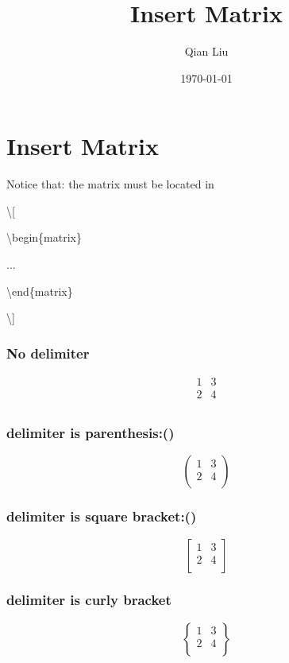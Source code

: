 \documentclass{article}
\author{Qian Liu}
\title{Insert Matrix}
\date{\today}
\begin{document}
\maketitle
\tableofcontents

\newpage
\section{Insert Matrix}
Notice that: the matrix must be located
in

\textbackslash[

    \quad\textbackslash begin\{matrix\}

    ...

    \quad\textbackslash end\{matrix\}

    \textbackslash]
\subsubsection{No delimiter}
\[
    \begin{matrix}
        1 & 3 \\
        2 & 4 \\    
    \end{matrix}
\]

\subsubsection{delimiter is parenthesis:()}
\[
    \begin{pmatrix}
        1 & 3 \\
        2 & 4 \\
    \end{pmatrix}
\]

\subsubsection{delimiter is square bracket:()}
\[
    \begin{bmatrix}
        1 & 3 \\
        2 & 4 \\
    \end{bmatrix}
\]

\subsubsection{delimiter is curly bracket}
\[
    \begin{Bmatrix}
        1 & 3 \\
        2 & 4 \\
    \end{Bmatrix}
\]
\end{document}

